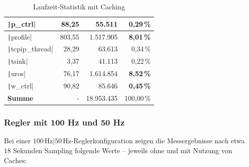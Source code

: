 \begin{table}[H]
{{\begin{minipage}[b]{0.50\hsize}
\begin{tabular}{|l|r|r|r|}
        \texttt|p_ctrl| & 88,25 & 55.511 & \textbf{0,29\,\%} \\ \hline
        \texttt|profile| & 803,55 & 1.517.905 & \textbf{8,01\,\%} \\ \hline
        \texttt|tcpip_thread| & 28,29 & 63.613 & 0,34\,\% \\ \hline
        \texttt|tsink| & 3,37 & 41.113 & 0,22\,\% \\ \hline
        \texttt|uros| & 76,17 & 1.614.854 & \textbf{8,52\,\%} \\ \hline
        \texttt|w_ctrl| & 90,82 & 85.646 & \textbf{0,45\,\%} \\ \hline
        \hline
        \textbf{Summe} & - & 18.953.435 & 100,00\,\% \\ \hline
        \end{tabular}
        \caption{Laufzeit-Statistik mit Caching}
    \end{minipage}
}}
\end{table}

\subsubsection{Regler mit 100 Hz und 50 Hz}

Bei einer $100\,\text{Hz}|50\,\text{Hz}$-Reglerkonfiguration zeigen die
Messergebnisse nach etwa $18$ Sekunden Sampling folgende Werte -- jeweils ohne
und mit Nutzung von Caches:

